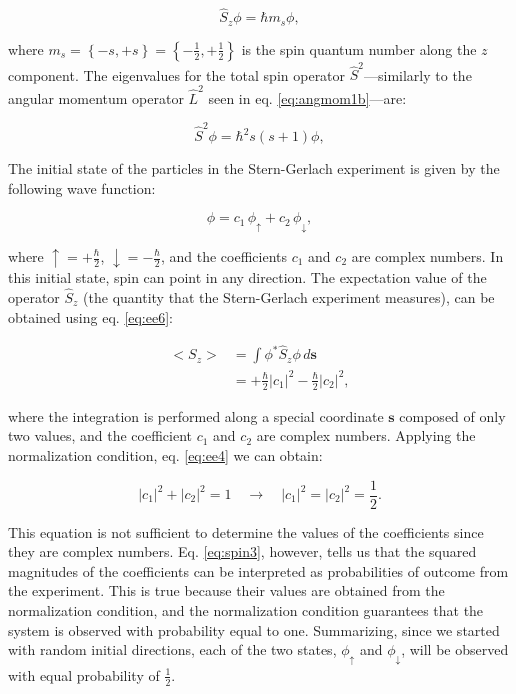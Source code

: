 \documentclass[
  9pt,
]{extbook}
\theoremstyle{definition}
\theoremstyle{definition}
\theoremstyle{definition}
\theoremstyle{remark}
\begin{document}
\begin{equation}
\hat{S}_z \phi = \hbar m_s \phi,
\label{eq:spin0b}
\end{equation}

where \(m_s=\left\{-s,+s\right\}=\left\{-\frac{1}{2},+\frac{1}{2}\right\}\) is the spin quantum number along the \(z\) component. The eigenvalues for the total spin operator \(\hat{S}^2\)---similarly to the angular momentum operator \(\hat{L}^2\) seen in eq. \eqref{eq:angmom1b}---are:

\begin{equation}
\hat{S}^2 \phi = \hbar^2 s(s+1) \phi,
\label{eq:spin0c}
\end{equation}

The initial state of the particles in the Stern-Gerlach experiment is given by the following wave function:

\begin{equation}
\phi = c_1\, \phi_{\uparrow} + c_2 \,\phi_{\downarrow},
\label{eq:spin1}
\end{equation}

where \(\uparrow=+\frac{\hbar}{2}\), \(\downarrow=-\frac{\hbar}{2}\), and the coefficients \(c_1\) and \(c_2\) are complex numbers. In this initial state, spin can point in any direction. The expectation value of the operator \(\hat{S}_z\) (the quantity that the Stern-Gerlach experiment measures), can be obtained using eq. \eqref{eq:ee6}:

\begin{equation}
\begin{aligned}
<S_z> &= \int \phi^{*} \hat{S}_z \phi \, d\mathbf{s} \\
 &= +\frac{\hbar}{2} \vert c_1\vert^2 -\frac{\hbar}{2} \vert c_2\vert^2,
\end{aligned}
\label{eq:spin2}    
\end{equation}

where the integration is performed along a special coordinate \(\mathbf{s}\) composed of only two values, and the coefficient \(c_1\) and \(c_2\) are complex numbers. Applying the normalization condition, eq. \eqref{eq:ee4} we can obtain:

\begin{equation}
|c_{1}|^{2}+|c_{2}|^{2}=1 \quad\longrightarrow\quad |c_{1}|^{2}=|c_{2}|^{2}=\frac{1}{2}.
\label{eq:spin3}    
\end{equation}

This equation is not sufficient to determine the values of the coefficients since they are complex numbers. Eq. \eqref{eq:spin3}, however, tells us that the squared magnitudes of the coefficients can be interpreted as probabilities of outcome from the experiment. This is true because their values are obtained from the normalization condition, and the normalization condition guarantees that the system is observed with probability equal to one. Summarizing, since we started with random initial directions, each of the two states, \(\phi_{\uparrow}\) and \(\phi_{\downarrow}\), will be observed with equal probability of \(\frac{1}{2}\).
\end{document}
